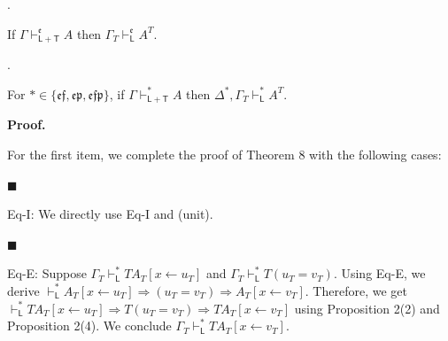 \documentclass[10pt,a4paper]{article}
\begin{document}
\par{}. 
 
If $\Gamma\vdash_{\mathsf{L}+\mathsf{T}}^{\mathfrak{e}}A$ then $\Gamma_{T}\vdash_{\mathsf{L}}^{\mathfrak{e}}A^{T}$.\par
 
 
 
\par{}. 
 
For $*\in\{\mathfrak{e}\mathfrak{f},\mathfrak{e}\mathfrak{p},\mathfrak{e}\mathfrak{f}\mathfrak{p}\}$, if $\Gamma\vdash_{\mathsf{L}+\mathsf{T}}^{*}A$ then $\Delta^{*},\Gamma_{T}\vdash_{\mathsf{L}}^{*}A^{T}$.\par
 
 
  
 
 
 
 
\par\medskip\noindent\textbf{Proof.}\par
 
 
For the first item, we complete the proof of Theorem 8 with the following cases:\par
  
\par\noindent  $\blacksquare$ 
 
Eq-I: We directly use Eq-I and (unit).\par
 
 
 
\par\noindent  $\blacksquare$ 
 
Eq-E: Suppose $\Gamma_{T}\vdash_{\mathsf{L}}^{*}TA_{T}[x\leftarrow u_{T}]$ and $\Gamma_{T}\vdash_{\mathsf{L}}^{*}T(u_{T}=v_{T})$. Using Eq-E, we derive $\vdash_{\mathsf{L}}^{*}A_{T}[x\leftarrow u_{T}]\mathbin{\Rightarrow}(u_{T}=v_{T})\mathbin{\Rightarrow}A_{T}[x\leftarrow v_{T}]$. Therefore, we get $\vdash_{\mathsf{L}}^{*}TA_{T}[x\leftarrow u_{T}]\mathbin{\Rightarrow}T(u_{T}=v_{T})\mathbin{\Rightarrow}TA_{T}[x\leftarrow v_{T}]$ using Proposition 2(2) and Proposition 2(4). We conclude $\Gamma_{T}\vdash_{\mathsf{L}}^{*}TA_{T}[x\leftarrow v_{T}]$.\par
 
\end{document}
